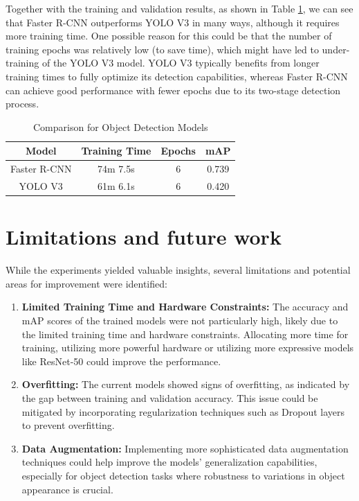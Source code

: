 \documentclass[UTF8]{ctexart}
\begin{document}
Together with the training and validation results, as shown in Table \ref{tab:objcomparison}, we can see that Faster R-CNN outperforms YOLO V3 in many ways,
although it requires more training time. 
One possible reason for this could be that the number of training epochs was relatively low (to save time), 
which might have led to under-training of the YOLO V3 model. 
YOLO V3 typically benefits from longer training times to fully optimize its detection capabilities, 
whereas Faster R-CNN can achieve good performance with fewer epochs due to its two-stage detection process.

\begin{table}[h]
    \centering
    \caption{Comparison for Object Detection Models}
    \label{tab:objcomparison}
    \begin{tabular}{|c|c|c|c|}
    \hline
    \textbf{Model} & \textbf{Training Time} & \textbf{Epochs} & \textbf{mAP} \\ \hline
    Faster R-CNN & 74m 7.5s & 6 & 0.739 \\ \hline
    YOLO V3 & 61m 6.1s & 6 & 0.420 \\ \hline
    \end{tabular}
\end{table}

\section{Limitations and future work}
While the experiments yielded valuable insights, several limitations and potential areas for improvement were identified:

\begin{enumerate}
    \item \textbf{Limited Training Time and Hardware Constraints:} The accuracy and mAP scores of the trained models were not particularly high, likely due to the limited training time and hardware constraints. Allocating more time for training, utilizing more powerful hardware or utilizing more expressive models like ResNet-50
    could improve the performance.
    
    \item \textbf{Overfitting:} The current models showed signs of overfitting, as indicated by the gap between training and validation accuracy. This issue could be mitigated by incorporating regularization techniques such as Dropout layers to prevent overfitting.
    
    \item \textbf{Data Augmentation:} Implementing more sophisticated data augmentation techniques could help improve the models' generalization capabilities, especially for object detection tasks where robustness to variations in object appearance is crucial.
\end{enumerate}
\end{document}
